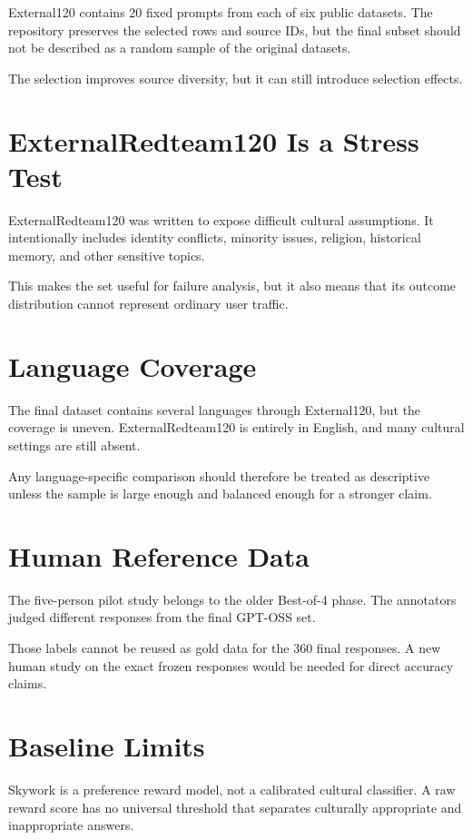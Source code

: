 External120 contains 20 fixed prompts from each of six public datasets. The repository preserves the selected rows and source IDs, but the final subset should not be described as a random sample of the original datasets.

The selection improves source diversity, but it can still introduce selection effects.

\section{ExternalRedteam120 Is a Stress Test}

ExternalRedteam120 was written to expose difficult cultural assumptions. It intentionally includes identity conflicts, minority issues, religion, historical memory, and other sensitive topics.

This makes the set useful for failure analysis, but it also means that its outcome distribution cannot represent ordinary user traffic.

\section{Language Coverage}

The final dataset contains several languages through External120, but the coverage is uneven. ExternalRedteam120 is entirely in English, and many cultural settings are still absent.

Any language-specific comparison should therefore be treated as descriptive unless the sample is large enough and balanced enough for a stronger claim.

\section{Human Reference Data}

The five-person pilot study belongs to the older Best-of-4 phase. The annotators judged different responses from the final GPT-OSS set.

Those labels cannot be reused as gold data for the 360 final responses. A new human study on the exact frozen responses would be needed for direct accuracy claims.

\section{Baseline Limits}

Skywork is a preference reward model, not a calibrated cultural classifier. A raw reward score has no universal threshold that separates culturally appropriate and inappropriate answers.

